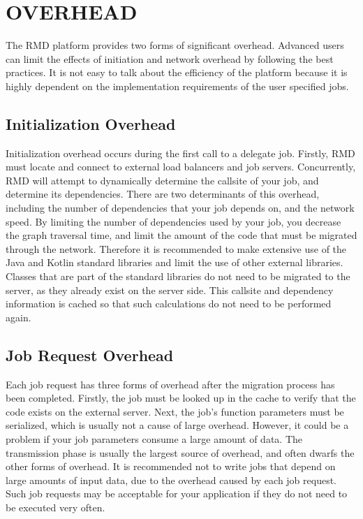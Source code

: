 \section{OVERHEAD}\label{sec:overhead}

The RMD platform provides two forms of significant overhead.
Advanced users can limit the effects of initiation and network
overhead by following the best practices.
It is not easy to talk about the efficiency of the platform
because it is highly dependent on the implementation requirements
of the user specified jobs.

\subsection{Initialization Overhead}\label{subsec:initializationOverhead}

Initialization overhead occurs during the first call to a delegate job.
Firstly, RMD must locate and connect to external load balancers and
job servers.
Concurrently, RMD will attempt to dynamically determine the callsite
of your job, and determine its dependencies.
There are two determinants of this overhead, including the
number of dependencies that your job depends on, and the network
speed.
By limiting the number of dependencies used by your job,
you decrease the graph traversal time, and limit the amount
of the code that must be migrated through the network.
Therefore it is recommended to make extensive use of the Java and Kotlin
standard libraries and limit the use of other external libraries.
Classes that are part of the standard libraries do not need to be migrated
to the server, as they already exist on the server side.
This callsite and dependency information is cached so that such calculations
do not need to be performed again.


\subsection{Job Request Overhead}\label{subsec:networkOverhead}

Each job request has three forms of overhead after the migration
process has been completed.
Firstly, the job must be looked up in the cache to verify
that the code exists on the external server.
Next, the job's function parameters must be serialized, which
is usually not a cause of large overhead. However, it could be a problem
if your job parameters consume a large amount of data.
The transmission phase is usually the largest source of overhead,
and often dwarfs the other forms of overhead.
It is recommended not to write jobs that depend on large amounts
of input data, due to the overhead caused by each job request.
Such job requests may be acceptable for your application if they do
not need to be executed very often.
